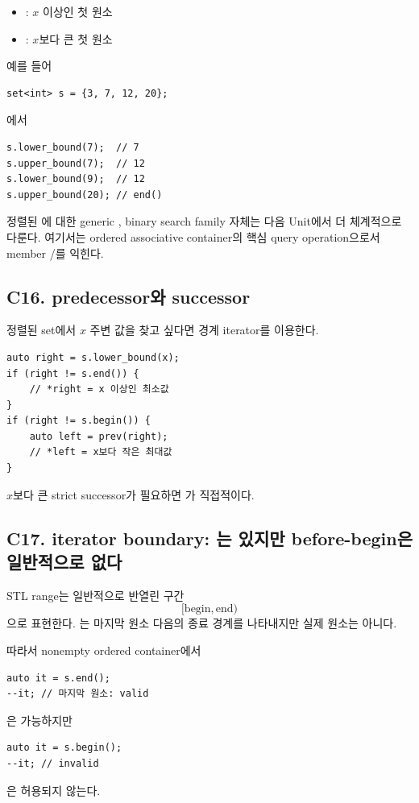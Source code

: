 \begin{itemize}
\item {}: $x$ 이상인 첫 원소
\item {}: $x$보다 큰 첫 원소
\end{itemize}

예를 들어
\begin{lstlisting}
set<int> s = {3, 7, 12, 20};
\end{lstlisting}
에서
\begin{lstlisting}
s.lower_bound(7);  // 7
s.upper_bound(7);  // 12
s.lower_bound(9);  // 12
s.upper_bound(20); // end()
\end{lstlisting}

\begin{notebox}[S1-B와의 경계]
정렬된 에 대한 generic , binary search family 자체는 다음 Unit에서 더 체계적으로 다룬다. 여기서는 ordered associative container의 핵심 query operation으로서 member /를 익힌다.
\end{notebox}

\subsection{C16. predecessor와 successor}
정렬된 set에서 $x$ 주변 값을 찾고 싶다면 경계 iterator를 이용한다.
\begin{lstlisting}
auto right = s.lower_bound(x);
if (right != s.end()) {
    // *right = x 이상인 최소값
}
if (right != s.begin()) {
    auto left = prev(right);
    // *left = x보다 작은 최대값
}
\end{lstlisting}

$x$보다 큰 strict successor가 필요하면 가 직접적이다.

\subsection{C17. iterator boundary: 는 있지만 before-begin은 일반적으로 없다}
STL range는 일반적으로 반열린 구간
\[
[\text{begin},\text{end})
\]
으로 표현한다. 는 마지막 원소 다음의 종료 경계를 나타내지만 실제 원소는 아니다.

따라서 nonempty ordered container에서
\begin{lstlisting}
auto it = s.end();
--it; // 마지막 원소: valid
\end{lstlisting}
은 가능하지만
\begin{lstlisting}
auto it = s.begin();
--it; // invalid
\end{lstlisting}
은 허용되지 않는다.

